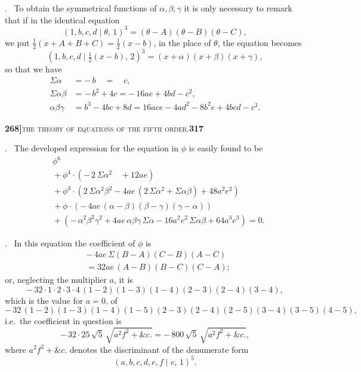\documentclass[11pt]{article}
\newcommand{\Cdel}{\mid}
\begin{document}
\medskip

. \ To obtain the symmetrical functions of $\alpha, \beta, \gamma$ it is only necessary to remark that if in the identical equation
\[
   (1, b, c, d\Cdel\theta,\,1)^3 = (\theta - A)(\theta - B)(\theta - C),
\]
we put $\tfrac{1}{2}(x + A + B + C) = \tfrac{1}{2}(x - b)$, in the place of $\theta$, the equation becomes
\[
   (1, b, c, d\Cdel\tfrac{1}{2}(x - b),\,2)^3 = (x + \alpha)(x + \beta)(x + \gamma),
\]
so that we have
\[
\begin{aligned}
   \Sigma\alpha &= -\,b\quad =\quad c,\\
   \Sigma\alpha\beta &= -\,b^2 + 4 c = -\,16 a e + 4 b d - c^2,\\
   \alpha\beta\gamma &= b^3 - 4 b c + 8 d = 16 a c e - 4 a d^2 - 8 b^2 e + 4 b c d - c^3.
\end{aligned}
\]

\newpage
\setcounter{page}{317}

\noindent\textbf{268]}\hfill\textsc{the theory of equations of the fifth order.}\hfill\textbf{317}

\medskip

. \ The developed expression for the equation in $\phi$ is easily found to be
\[
\begin{aligned}
   &\phi^6\\
   &{} + \phi^4\cdot(-\,2\,\Sigma\alpha^2\quad + 12 a e)\\
   &{} + \phi^3\cdot(2\,\Sigma\alpha^2\beta^2 - 4 a e\,(2\,\Sigma\alpha^2 + \Sigma\alpha\beta) + 48 a^2 e^2)\\
   &{} + \phi\cdot(-\,4 a e\,(\alpha - \beta)(\beta - \gamma)(\gamma - \alpha))\\
   &{} + (-\,\alpha^2\beta^2\gamma^2 + 4 a e\,\alpha\beta\gamma\,\Sigma\alpha - 16 a^2 e^2\,\Sigma\alpha\beta + 64 a^3 e^3) = 0.
\end{aligned}
\]

\medskip

. \ In this equation the coefficient of $\phi$ is
\[
\begin{aligned}
   &-\,4 a e\,\Sigma(B - A)(C - B)(A - C)\\
   &{} = 32 a e\,(A - B)(B - C)(C - A);
\end{aligned}
\]
or, neglecting the multiplier $a$, it is
\[
   -\,32\cdot 1\cdot 2\cdot 3\cdot 4\,(1 - 2)(1 - 3)(1 - 4)(2 - 3)(2 - 4)(3 - 4),
\]
which is the value for $a = 0$, of
\[
   -\,32\,(1 - 2)(1 - 3)(1 - 4)(1 - 5)(2 - 3)(2 - 4)(2 - 5)(3 - 4)(3 - 5)(4 - 5),
\]
i.e.\ the coefficient in question is
\[
   -\,32\cdot 25\,\sqrt{5}\,\sqrt{a^2 f^2 + \&c.} = -\,800\,\sqrt{5}\,\sqrt{a^2 f^2 + \&c.},
\]
where $a^2 f^2 + \&c.$ denotes the discriminant of the denumerate form
\[
   (a, b, c, d, e, f\Cdel v,\,1)^5.
\]
\end{document}

